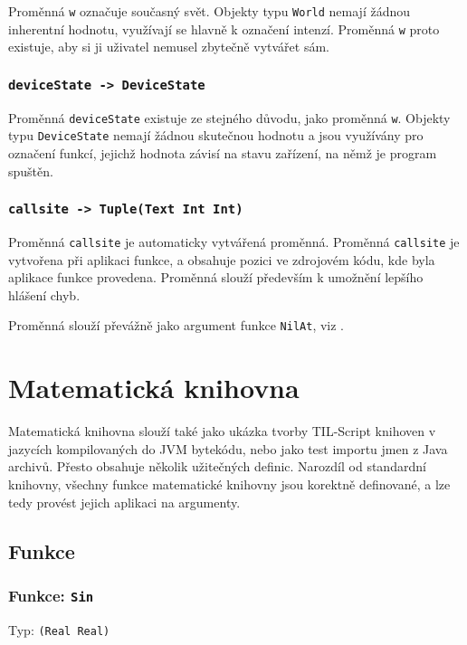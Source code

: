Proměnná \lstinline{w} označuje současný svět. Objekty typu \lstinline{World} nemají žádnou
inherentní hodnotu, využívají se hlavně k označení intenzí. Proměnná \lstinline{w} proto existuje,
aby si ji uživatel nemusel zbytečně vytvářet sám.

\subsubsection{\lstinline{deviceState -> DeviceState}}

Proměnná \lstinline{deviceState} existuje ze stejného důvodu, jako proměnná \lstinline{w}. Objekty
typu \lstinline{DeviceState} nemají žádnou skutečnou hodnotu a jsou využívány pro označení funkcí,
jejichž hodnota závisí na stavu zařízení, na němž je program spuštěn.

\subsubsection{\lstinline{callsite -> Tuple(Text Int Int)}}\label{callsite-var}

Proměnná \lstinline{callsite} je automaticky vytvářená proměnná. Proměnná \lstinline{callsite}
je vytvořena při aplikaci funkce, a obsahuje pozici ve zdrojovém kódu, kde byla aplikace funkce
provedena. Proměnná slouží především k umožnění lepšího hlášení chyb.

Proměnná slouží převážně jako argument funkce \lstinline{NilAt}, viz .

\section{Matematická knihovna}

Matematická knihovna slouží také jako ukázka tvorby TIL-Script knihoven v jazycích kompilovaných
do JVM bytekódu, nebo jako test importu jmen z Java archivů. Přesto obsahuje několik užitečných
definic. Narozdíl od standardní knihovny, všechny funkce matematické knihovny jsou korektně
definované, a lze tedy provést jejich aplikaci na argumenty.

\subsection{Funkce}

\subsubsection*{Funkce: \lstinline{Sin}}
Typ: \lstinline{(Real Real)}

